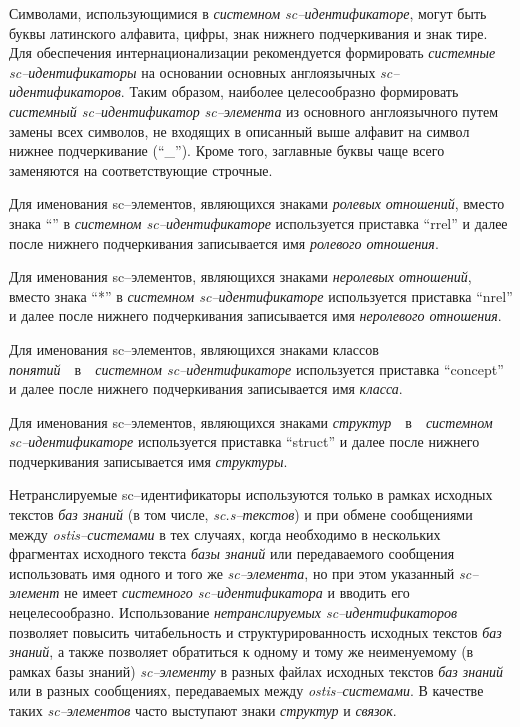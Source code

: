 Символами, использующимися в \textit{системном sc--идентификаторе}, могут быть буквы латинского алфавита, цифры, знак нижнего подчеркивания и знак тире. Для обеспечения интернационализации рекомендуется формировать \textit{системные sc--идентификаторы} на основании основных англоязычных \textit{sc--идентификаторов}. Таким образом, наиболее целесообразно формировать \textit{системный sc--идентификатор} \textit{sc--элемента} из основного англоязычного путем замены всех символов, не входящих в описанный выше алфавит на символ нижнее подчеркивание (``\_''). Кроме того, заглавные буквы чаще всего заменяются на соответствующие строчные.

Для именования sc--элементов, являющихся знаками \textit{ролевых отношений}, вместо знака ``\scnrolesign'' в \textit{системном sc--идентификаторе} используется приставка ``rrel'' и далее после нижнего подчеркивания записывается имя \textit{ролевого отношения}.

Для именования sc--элементов, являющихся знаками \textit{неролевых отношений}, вместо знака ``*'' в \textit{системном sc--идентификаторе} используется приставка ``nrel'' и далее после нижнего подчеркивания записывается имя \textit{неролевого отношения}.

Для именования sc--элементов, являющихся знаками классов \textit{понятий}~~в~~\textit{системном sc--идентификаторе} используется приставка ``concept'' и далее после нижнего подчеркивания записывается имя \textit{класса}.

Для именования sc--элементов, являющихся знаками \textit{структур}~~в~~\textit{системном sc--идентификаторе} используется приставка ``struct'' и далее после нижнего подчеркивания записывается имя \textit{структуры}.


\begin{SCn}
\end{SCn}

Нетранслируемые sc--идентификаторы используются только в рамках исходных текстов \textit{баз знаний} (в том числе, \textit{sc.s--текстов}) и при обмене сообщениями между \textit{ostis--системами} в тех случаях, когда необходимо в нескольких фрагментах исходного текста \textit{базы знаний} или передаваемого сообщения использовать имя одного и того же \textit{sc--элемента}, но при этом указанный \textit{sc--элемент} не имеет \textit{системного sc--идентификатора} и вводить его нецелесообразно. Использование \textit{нетранслируемых sc--идентификаторов} позволяет повысить читабельность и структурированность исходных текстов \textit{баз знаний}, а также позволяет обратиться к одному и тому же неименуемому (в рамках базы знаний) \textit{sc--элементу} в разных файлах исходных текстов \textit{баз знаний} или в разных сообщениях, передаваемых между \textit{ostis--системами}. В качестве таких \textit{sc--элементов} часто выступают знаки \textit{структур} и \textit{связок}.

